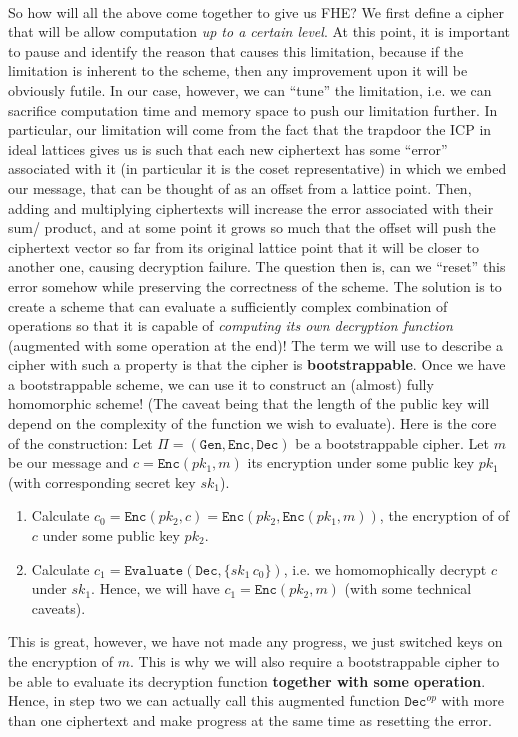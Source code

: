 \documentclass{article}
\theoremstyle{definition}
\theoremstyle{example}
\newcommand{\Enc}{\texttt{Enc}}
\newcommand{\Dec}{\texttt{Dec}}
\newcommand{\Gen}{\texttt{Gen}}
\newcommand{\Evaluate}{\texttt{Evaluate}}
\begin{document}
\paragraph{} So how will all the above come together to give us FHE?
We first define a cipher that will be allow computation \textit{up to a certain
  level}. At this point, it is important to pause and identify the reason that
causes this limitation, because if the limitation is inherent to the scheme,
then any improvement upon it will be obviously futile. In our case, however, we
can ``tune'' the limitation, i.e. we can sacrifice computation time and memory
space to push our limitation further. In particular, our limitation will come
from the fact that the trapdoor the ICP in ideal lattices gives us is such that
each new ciphertext has some ``error'' associated with it (in particular it is the
coset representative) in which we embed our
message, that can be thought of as an offset from a lattice point. Then, adding
and multiplying ciphertexts will increase the error associated with their sum/
product, and at some point it grows so much that the offset will push the
ciphertext vector so far from its original lattice point that it will be closer
to another one, causing decryption failure. The question then is, can we
``reset'' this error somehow while preserving the correctness of the scheme.
The solution is to create a scheme that can evaluate a sufficiently complex
combination of operations so that it is capable of \textit{computing its own decryption function} (augmented with some operation at
the end)! The term we will use to describe a cipher with such a property is that
the cipher is \textbf{bootstrappable}.  Once we have a bootstrappable scheme, we
can use it to construct an (almost) fully homomorphic scheme! (The caveat being
that the length of the public key will depend on the complexity of the function
we wish to evaluate). Here is the core of the construction: Let $\Pi = (\Gen,
\Enc, \Dec)$ be a bootstrappable cipher. Let $m$ be our message and $c =
\Enc(pk_1, m)$ its encryption under some public key $pk_1$ (with corresponding
secret key $sk_1$).
\begin{enumerate}
  \item Calculate $c_0 = \Enc(pk_2, c) = \Enc(pk_2, \Enc(pk_1, m))$, the encryption of
    of $c$ under some public key $pk_2$.
  \item Calculate $c_1 = \Evaluate(\Dec, \{sk_1\, c_0\})$, i.e. we homomophically
  decrypt $c$ under $sk_1$. Hence, we will have $c_1 = \Enc(pk_2, m)$ (with
  some technical caveats).
\end{enumerate}
This is great, however, we have not made any progress, we just switched keys on
the encryption of $m$. This is why we will also require a bootstrappable cipher
to be able to evaluate its decryption function \textbf{together with some
  operation}. Hence, in step two we can actually call this augmented function
$\Dec^{op}$ with more than one ciphertext and make progress at the same time as
resetting the error.
\end{document}
